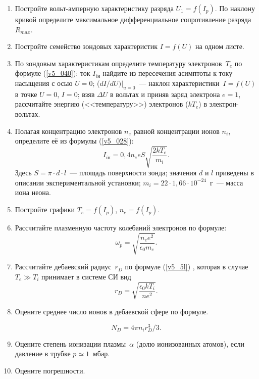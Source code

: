  \begin{enumerate}

\item Постройте вольт-амперную характеристику разряда $U_{1}=f(I_{p})$. По наклону кривой определите максимальное дифференциальное сопротивление разряда $R_{max}$.

\item Постройте семейство зондовых характеристик $I=f(U)$ на одном листе.

\item По зондовым характеристикам определите температуру электронов~$T_{e}$ по формуле (\eqref{v5_040}):%
 ток $I_{iн}$ %
 найдите из пересечения асимптоты к току насыщения с осью $U=0$; ($dI/dU)|_{u=0}$~--- наклон
характеристики~$I=f(U)$ в точке $U=0$, $I=0$; взяв $\Delta U$ в вольтах и приняв заряд электрона $e=1$, рассчитайте
энергию (<<температуру>>) электронов ($kT_{e}$) в электрон-вольтах.

\item Полагая концентрацию электронов $n_{e}$ равной концентрации ионов $n_{i}$, определите её из формулы (\eqref{v5_028}):%
\begin{equation*}
	I_{iн}=0,4n_{e}eS\sqrt{\frac{2kT_{e}}{m_{i}}}.
\end{equation*}
Здесь $S=\pi\cdot d\cdot l$~--- площадь поверхности зонда; значения $d$ и $l$ приведены в описании экспериментальной
установки; $m_i=22\cdot 1,66\cdot 10^{-24}$~г~--- масса иона неона.

\item Постройте графики $T_e=f(I_p)$, $n_e=f(I_p)$.

\item Рассчитайте плазменную частоту колебаний электронов по формуле:
\begin{equation*}
	\omega_{p}=\sqrt{\frac{n_{e} e^2}{\epsilon_{0} m_{e}} }.
\end{equation*}

\item Рассчитайте дебаевский радиус~$r_{D}$ по формуле (\eqref{v5_5l})%
, которая в случае $T_{e}\gg T_{i}$ принимает в системе СИ
вид
\begin{equation*}
	r_{D}=\sqrt{\frac{\epsilon_{0}kT_{i}}{ne^{2}}}.
\end{equation*}

\item Оцените среднее число ионов в дебаевской сфере по формуле.

\begin{equation*}
	N_{D}=4\pi n_{i}r_{D}^{3}/3.
\end{equation*}

\item Оцените степень ионизации плазмы~$\alpha$ (долю ионизованных атомов), если давление в трубке $p\simeq 1$~мбар.

\item Оцените погрешности.

\end{enumerate}